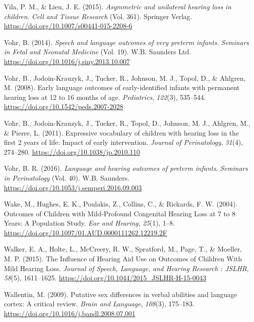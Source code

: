 \documentclass[english,man]{apa6}
\begin{document}
\leavevmode\hypertarget{ref-vila2015}{}%
Vila, P. M., \& Lieu, J. E. (2015). \emph{Asymmetric and unilateral hearing loss in children}. \emph{Cell and Tissue Research} (Vol. 361). Springer Verlag. \url{https://doi.org/10.1007/s00441-015-2208-6}

\leavevmode\hypertarget{ref-vohr2014}{}%
Vohr, B. (2014). \emph{Speech and language outcomes of very preterm infants}. \emph{Seminars in Fetal and Neonatal Medicine} (Vol. 19). W.B. Saunders Ltd. \url{https://doi.org/10.1016/j.siny.2013.10.007}

\leavevmode\hypertarget{ref-vohr2008}{}%
Vohr, B., Jodoin-Krauzyk, J., Tucker, R., Johnson, M. J., Topol, D., \& Ahlgren, M. (2008). Early language outcomes of early-identified infants with permanent hearing loss at 12 to 16 months of age. \emph{Pediatrics}, \emph{122}(3), 535--544. \url{https://doi.org/10.1542/peds.2007-2028}

\leavevmode\hypertarget{ref-vohr2011}{}%
Vohr, B., Jodoin-Krauzyk, J., Tucker, R., Topol, D., Johnson, M. J., Ahlgren, M., \& Pierre, L. (2011). Expressive vocabulary of children with hearing loss in the first 2 years of life: Impact of early intervention. \emph{Journal of Perinatology}, \emph{31}(4), 274--280. \url{https://doi.org/10.1038/jp.2010.110}

\leavevmode\hypertarget{ref-vohr2016}{}%
Vohr, B. R. (2016). \emph{Language and hearing outcomes of preterm infants}. \emph{Seminars in Perinatology} (Vol. 40). W.B. Saunders. \url{https://doi.org/10.1053/j.semperi.2016.09.003}

\leavevmode\hypertarget{ref-wake2004}{}%
Wake, M., Hughes, E. K., Poulakis, Z., Collins, C., \& Rickards, F. W. (2004). Outcomes of Children with Mild-Profound Congenital Hearing Loss at 7 to 8 Years: A Population Study. \emph{Ear and Hearing}, \emph{25}(1), 1--8. \url{https://doi.org/10.1097/01.AUD.0000111262.12219.2F}

\leavevmode\hypertarget{ref-walker2015}{}%
Walker, E. A., Holte, L., McCreery, R. W., Spratford, M., Page, T., \& Moeller, M. P. (2015). The Influence of Hearing Aid Use on Outcomes of Children With Mild Hearing Loss. \emph{Journal of Speech, Language, and Hearing Research : JSLHR}, \emph{58}(5), 1611--1625. \url{https://doi.org/10.1044/2015_JSLHR-H-15-0043}

\leavevmode\hypertarget{ref-wallentin2009}{}%
Wallentin, M. (2009). Putative sex differences in verbal abilities and language cortex: A critical review. \emph{Brain and Language}, \emph{108}(3), 175--183. \url{https://doi.org/10.1016/j.bandl.2008.07.001}
\end{document}
